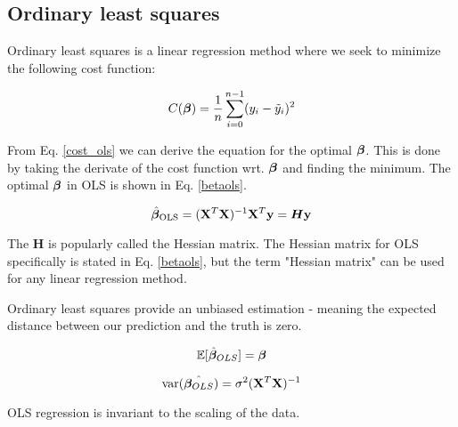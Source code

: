 

\subsection{Ordinary least squares}

Ordinary least squares is a linear regression method where we seek to minimize the following cost function:

\begin{equation}\label{cost_ols}
    C(\boldsymbol{\beta}) = \frac{1}{n}\sum_{i=0}^{n-1}(y_i-\Tilde{y}_i)^2
\end{equation}

From Eq. \ref{cost_ols} we can derive the equation for the optimal $\boldsymbol{\beta}$. This is done by taking the derivate of the cost function wrt. $\boldsymbol{\beta}$ and finding the minimum. The optimal $\boldsymbol{\beta}$ in OLS is shown in Eq. \ref{betaols}. 

\begin{equation}\label{betaols}
    \hat{\boldsymbol{\beta}}_{\text{OLS}} = (\mathbf{X}^T\mathbf{X})^{-1}\mathbf{X}^T\mathbf{y} = \boldsymbol{H}\mathbf{y}
\end{equation}

The $\boldsymbol{H}$ is popularly called the Hessian matrix. The Hessian matrix for OLS specifically is stated in Eq. \ref{betaols}, but the term "Hessian matrix" can be used for any linear regression method.


Ordinary least squares provide an unbiased estimation - meaning the expected distance between our prediction and the truth is zero. 

\begin{equation}
    \mathbb{E}[\hat{\boldsymbol{\beta}}_{OLS}] = \boldsymbol{\beta}
\end{equation}

\begin{equation}
   \text{var}(\hat{\boldsymbol{\beta}_{OLS}}) = \sigma^2 (\mathbf{X}^T\mathbf{X})^{-1}
\end{equation}

OLS regression is invariant to the scaling of the data.


